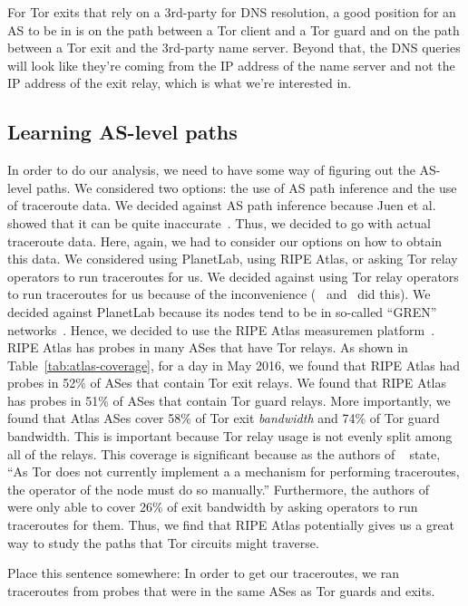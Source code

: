 For Tor exits that rely on a 3rd-party for DNS resolution, a good position for an AS 
to be in is on the path between 
a Tor client and a Tor guard and on the path between a Tor exit and the 3rd-party 
name server.  Beyond that, the DNS queries will look like they're coming from the IP address 
of the name server and not the IP address of the exit relay, which is what we're interested 
in.

\subsection{Learning AS-level paths}
In order to do our analysis, we need to have some way of figuring out the AS-level paths.  
We considered two options: the use of AS path inference and the use of traceroute data. 
We decided against AS path inference because Juen et al. showed that it can be quite 
inaccurate~\cite{Juen2015a}.  Thus, we decided to go with actual traceroute data. Here, 
again, we had to consider our options on how to obtain this data. We considered using 
PlanetLab, using RIPE Atlas, or asking Tor relay operators to run traceroutes for us.  
We decided against using Tor relay operators to run traceroutes for 
us because of the inconvenience (~\cite{Juen2015a} and~\cite{Murdoch2007a} did this). 
We decided against PlanetLab because its nodes tend to be in so-called ``GREN'' 
networks~\cite{banerjee2004interdomain}.  Hence, we 
decided to use the RIPE Atlas measuremen platform~\cite{atlas}. 
RIPE Atlas has probes in many ASes that have Tor relays. 
As shown in Table~\ref{tab:atlas-coverage}, for a day in May 2016, we found that
RIPE Atlas had probes in 52\% of ASes that contain Tor exit relays.  We found that RIPE
Atlas has probes in 51\% of ASes that contain Tor guard relays.  More importantly, we found 
that Atlas ASes cover 58\% of Tor exit \textit{bandwidth} and 74\% of Tor guard bandwidth. This is 
important because Tor relay usage is not evenly split among all of the relays.  This
coverage is significant because as the authors of ~\cite{Murdoch2007a} state, 
``As Tor does not currently 
implement a a mechanism for performing traceroutes, the operator of the node must do so
manually.'' Furthermore, the authors of ~\cite{Juen2015a} were only able to cover 26\% of exit bandwidth
by asking operators to run traceroutes for them.  Thus, we find that RIPE Atlas 
potentially gives us a 
great way to study the paths that Tor circuits might traverse.  

Place this sentence somewhere: In order to get
our traceroutes, we ran traceroutes from probes that were in the same ASes
as Tor guards and exits. 

